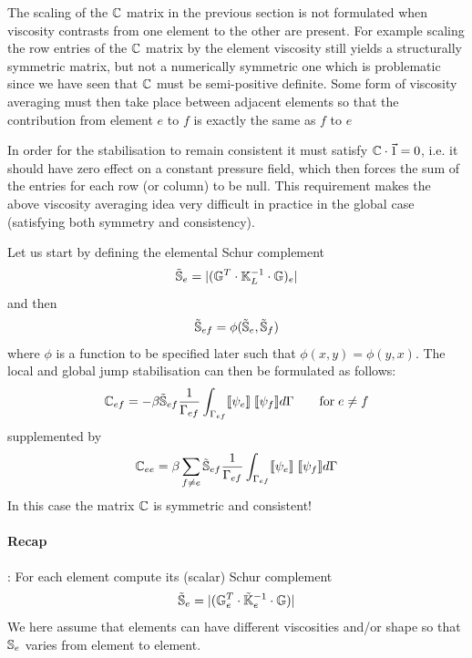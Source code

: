 The scaling of the ${\mathbb{C}}$ matrix in the previous section is not formulated when viscosity contrasts from one element to the other are present. For example scaling the row entries of the ${\mathbb{C}}$ matrix by the element viscosity still yields a structurally symmetric matrix, but not a numerically symmetric one which is problematic since we have seen that ${\mathbb{C}}$ must be semi-positive definite. Some form of viscosity averaging must then take place between adjacent elements so that the contribution from element $e$ to $ f$ is exactly the same as $f$ to $e$

In order for the stabilisation to remain consistent it must satisfy ${\mathbb{C}}\cdot \vec{1}= 0$, i.e. it should have zero effect on a constant pressure field, which then forces the sum of the entries for each row (or column) to be null. This requirement makes the above viscosity averaging idea very difficult in practice in the global case (satisfying both symmetry and consistency).



Let us start by defining the elemental Schur complement
\[
\tilde{{\mathbb{S}}}_e = |({\mathbb{G}}^T\cdot {\mathbb{K}}_L^{-1} \cdot {\mathbb{G}})_e|
\]
and then 
\[
\tilde{{\mathbb{S}}}_{ef} = \phi( \tilde{{\mathbb{S}}}_e , \tilde{{\mathbb{S}}}_f)   
\]
where $\phi$ is a function to be specified later such that $\phi(x,y)=\phi(y,x)$.
The local and global jump stabilisation can then be 
formulated as follows:
\begin{equation}
{\mathbb{C}}_{ef} = -\beta \tilde{{\mathbb{S}}}_{ef}  
\frac{1}{\Gamma_{ef}} \int_{\Gamma_{ef}} \llbracket \psi_e \rrbracket \; \llbracket \psi_f \rrbracket d\Gamma
\qquad
\text{for} \; e\ne f
\label{eq:Cchriston2}
\end{equation}
supplemented by
\[
{\mathbb{C}}_{ee} =  \beta 
\sum_{f\ne e} \tilde{{\mathbb{S}}}_{ef}\frac{1}{\Gamma_{ef}} \int_{\Gamma_{ef}} \llbracket \psi_e \rrbracket \; \llbracket \psi_f \rrbracket d\Gamma
\]
In this case the matrix ${\mathbb{C}}$ is symmetric and consistent!



\newpage
\paragraph{Recap}: For each element compute its (scalar) Schur complement
\[
\tilde{{\mathbb{S}}}_e = |({\mathbb{G}}_e^T\cdot \tilde{{\mathbb{K}}}_e^{-1} \cdot {\mathbb{G}})|
\]
We here assume that elements can have different viscosities and/or shape so that ${\mathbb{S}}_e$ varies 
from element to element. 


